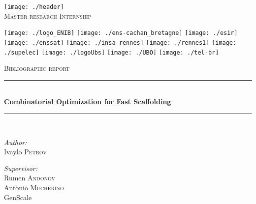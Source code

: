 \documentclass[11pt]{article}
\newcommand{\HRule}{\rule{\linewidth}{0.5mm}}
\begin{document}
\begin{titlepage}

\begin{center}


 

\texttt{[image: ./header]}\\[1cm]
\textsc{\Large Master research Internship}
\vspace{1cm}

\texttt{[image: ./logo\_ENIB]}
\texttt{[image: ./ens-cachan\_bretagne]}
\texttt{[image: ./esir]}
\texttt{[image: ./enssat]}
\texttt{[image: ./insa-rennes]}
\texttt{[image: ./rennes1]}
\texttt{[image: ./supelec]}
\texttt{[image: ./logoUbs]}
\texttt{[image: ./UBO]}
\texttt{[image: ./tel-br]}


  
\vspace{1cm}
\textsc{\Large Bibliographic report }\\[0.5cm]


\HRule \\[0.4cm]
{ \Large \bfseries Combinatorial Optimization for Fast Scaffolding }\\[0.4cm]

\HRule \\[1.5cm]

\begin{minipage}{0.4\textwidth}
\begin{flushleft} \large
\emph{Author:}\\
Ivaylo \textsc{Petrov}
\end{flushleft}
\end{minipage}
\begin{minipage}{0.4\textwidth}
\begin{flushright} \large
\emph{Supervisor:} \\
%
Rumen \textsc{Andonov} \\
Antonio \textsc{Mucherino} \\
GenScale
\end{flushright}
\end{minipage}

\vfill



\end{center}
\end{titlepage}
\end{document}
